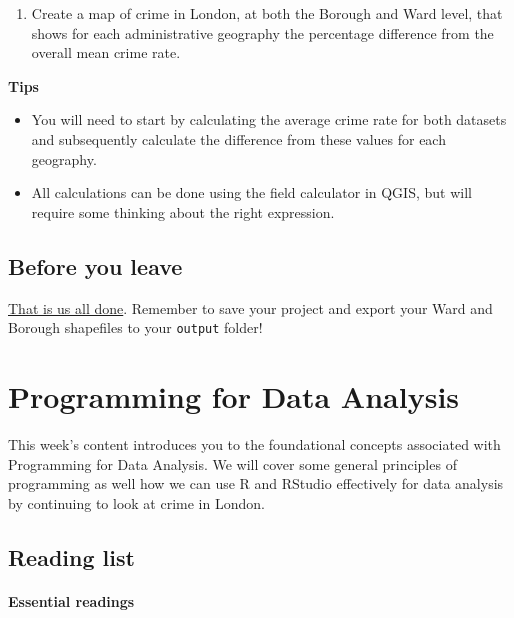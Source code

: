 \documentclass[
]{book}
\providecommand{\tightlist}{%
  \setlength{\itemsep}{0pt}\setlength{\parskip}{0pt}}
\begin{document}
\begin{enumerate}
\def\labelenumi{\arabic{enumi}.}
\setcounter{enumi}{1}
\tightlist
\item
  Create a map of crime in London, at both the Borough and Ward level, that shows for each administrative geography the percentage difference from the overall mean crime rate.
\end{enumerate}

\textbf{Tips}

\begin{itemize}
\tightlist
\item
  You will need to start by calculating the average crime rate for both datasets and subsequently calculate the difference from these values for each geography.
\item
  All calculations can be done using the field calculator in QGIS, but will require some thinking about the right expression.
\end{itemize}

\hypertarget{byl-w03}{%
\section{Before you leave}\label{byl-w03}}

\href{https://www.youtube.com/watch?v=3wxyN3z9PL4}{That is us all done}. Remember to save your project and export your Ward and Borough shapefiles to your \texttt{output} folder!

\hypertarget{programming-for-data-analysis}{%
\chapter{Programming for Data Analysis}\label{programming-for-data-analysis}}

This week's content introduces you to the foundational concepts associated with Programming for Data Analysis. We will cover some general principles of programming as well how we can use R and RStudio effectively for data analysis by continuing to look at crime in London.

\hypertarget{reading-w04}{%
\section{Reading list}\label{reading-w04}}

\hypertarget{essential-readings-3}{%
\subsubsection*{Essential readings}\label{essential-readings-3}}
\end{document}

